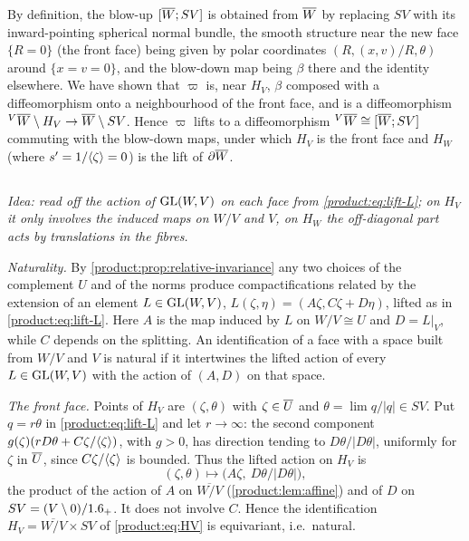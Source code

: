 By definition, the blow-up $[\overline{W};SV]$ is obtained from $\overline{W}$ by replacing $SV$
with its inward-pointing spherical normal bundle, the smooth structure near the new
face $\{R=0\}$ (the front face) being given by polar coordinates
$(R,(x,v)/R,\theta)$ around $\{x=v=0\}$, and the blow-down map being $\beta$ there
and the identity elsewhere. We have shown that $\varpi$ is, near $H_V$, $\beta$
composed with a diffeomorphism onto a neighbourhood of the front face, and is a
diffeomorphism ${}^{V}\overline{W}\setminus H_V\to\overline{W}\setminus SV$. Hence $\varpi$ lifts to
a diffeomorphism ${}^{V}\overline{W}\cong[\overline{W};SV]$ commuting with the blow-down maps, under
which $H_V$ is the front face and $H_W$ (where $s'=1/\langle \zeta\rangle=0$) is the lift of
$\partial\overline{W}$.

\subsection*{}
\emph{Idea: read off the action of $\operatorname{GL}(W,V)$ on each face from
\eqref{product:eq:lift-L}; on $H_V$ it only involves the induced maps on $W/V$ and
$V$, on $H_W$ the off-diagonal part acts by translations in the fibres.}

\emph{Naturality.} By \cref{product:prop:relative-invariance} any two choices of the
complement $U$ and of the norms produce compactifications related by the extension
of an element $L\in\operatorname{GL}(W,V)$, $L(\zeta,\eta)=(A\zeta,C\zeta+D\eta)$, lifted as in
\eqref{product:eq:lift-L}. Here $A$ is the map induced by $L$ on $W/V\cong U$ and
$D=L|_V$, while $C$ depends on the splitting. An identification of a face with a space
built from $W/V$ and $V$ is natural if it intertwines the lifted action of every
$L\in\operatorname{GL}(W,V)$ with the action of $(A,D)$ on that space.

\emph{The front face.} Points of $H_V$ are $(\zeta,\theta)$ with $\zeta\in\overline{U}$ and
$\theta=\lim q/|q|\in SV$. Put $q=r\theta$ in \eqref{product:eq:lift-L} and let
$r\to\infty$: the second component $g(\zeta)(rD\theta+C\zeta/\langle \zeta\rangle)$, with
$g>0$, has direction tending to $D\theta/|D\theta|$, uniformly for $\zeta$ in $\overline{U}$,
since $C\zeta/\langle \zeta\rangle$ is bounded. Thus the lifted action on $H_V$ is
\begin{equation*}
(\zeta,\theta)\longmapsto\big(A\zeta,\ D\theta/|D\theta|\big),
\end{equation*}
the product of the action of $A$ on $\overline{W/V}$ (\cref{product:lem:affine}) and
of $D$ on $SV=(V\setminus0)/1.6_+$. It does not involve $C$. Hence the identification
$H_V=\overline{W/V}\times SV$ of \eqref{product:eq:HV} is equivariant, i.e.\ natural.

